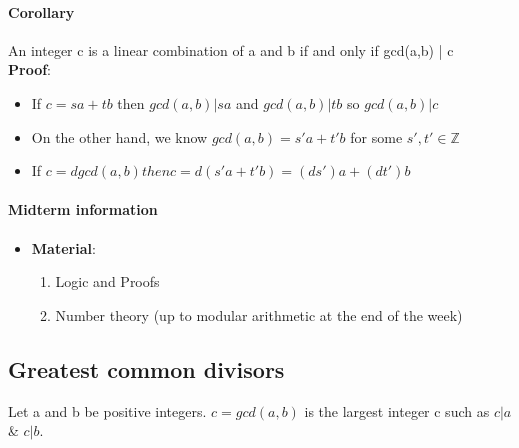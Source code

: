 \documentclass[9pt, letterpaper, oneside]{article}
\begin{document}
\paragraph{Corollary}
    An integer c is a linear combination of a and b if and only if gcd(a,b) | c \\
    \textbf{Proof}:
    \begin{itemize}
        \item If $c = sa + tb$ then $gcd(a,b) | sa$ and $gcd(a,b) | tb$ so $gcd(a,b) | c$
        \item On the other hand, we know $gcd(a, b) = s'a + t'b$ for some $s', t' \in \mathbb{Z}$
        \item If $c = d gcd(a, b) then c = d(s'a + t'b) = (ds')a + (dt')b$
    \end{itemize}




\paragraph{Midterm information}
    \begin{itemize}
        \item \textbf{Material}: 
        \begin{enumerate}
            \item Logic and Proofs
            \item Number theory (up to modular arithmetic at the end of the week)
        \end{enumerate}
    \end{itemize}

\subsection{Greatest common divisors}
Let a and b be positive integers.
$c = gcd(a,b)$ is the largest integer c such as $c | a$ \& $c | b$.
\end{document}
